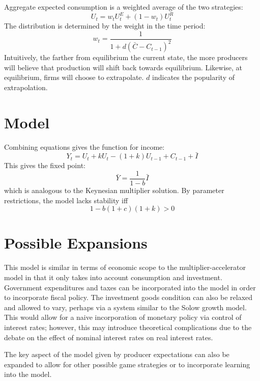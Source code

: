 \documentclass[]{article}
\begin{document}
Aggregate expected consumption is a weighted average of the two strategies:
\begin{equation*}
	U_t=w_tU_t^E+(1-w_t)U_t^R
\end{equation*}
The distribution is determined by the weight in the time period:
\begin{equation*}
	w_t=\frac{1}{1+d(\bar C-C_{t-1})^2}
\end{equation*}
Intuitively, the farther from equilibrium the current state, the more producers will believe that production will shift back towards equilibrium. Likewise, at equilibrium, firms will choose to extrapolate. $d$ indicates the popularity of extrapolation. 
\section*{Model}
Combining equations gives the function for income:
\begin{equation*}
	Y_t=U_t+kU_t-(1+k)U_{t-1}+C_{t-1}+\bar I
\end{equation*}
This gives the fixed point:
\begin{equation*}
	\bar Y=\frac{1}{1-b}\bar I
\end{equation*}
which is analogous to the Keynesian multiplier solution. By parameter restrictions, the model lacks stability iff
\begin{equation*}
	1-b(1+c)(1+k)>0
\end{equation*}
\section*{Possible Expansions}
This model is similar in terms of economic scope to the multiplier-accelerator model in that it only takes into account consumption and investment. Government expenditures and taxes can be incorporated into the model in order to incorporate fiscal policy. The investment goods condition can also be relaxed and allowed to vary, perhaps via a system similar to the Solow growth model. This would allow for a naive incorporation of monetary policy via control of interest rates; however, this may introduce theoretical complications due to the debate on the effect of nominal interest rates on real interest rates.

The key aspect of the model given by producer expectations can also be expanded to allow for other possible game strategies or to incorporate learning into the model. 
\end{document}
